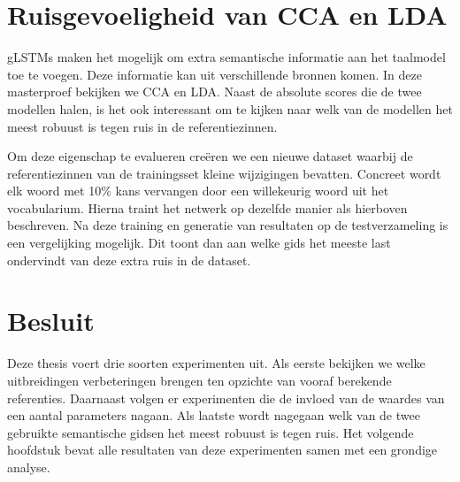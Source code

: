 \section{Ruisgevoeligheid van CCA en LDA} %
\label{sec:ruisgevoeligheid_van_cca_en_lda_exp}
gLSTMs maken het mogelijk om extra semantische informatie aan het taalmodel toe te voegen. Deze informatie kan uit verschillende bronnen komen. In deze masterproef bekijken we CCA en LDA. Naast de absolute scores die de twee modellen halen, is het ook interessant om te kijken naar welk van de modellen het meest robuust is tegen ruis in de referentiezinnen.

Om deze eigenschap te evalueren cre\"eren we een nieuwe dataset waarbij de referentiezinnen van de trainingsset kleine wijzigingen bevatten.
Concreet wordt elk woord met 10\% kans vervangen door een willekeurig woord uit het vocabularium. Hierna traint het netwerk op dezelfde manier als hierboven beschreven. Na deze training en generatie van resultaten op de testverzameling is een vergelijking mogelijk. Dit toont dan aan welke gids het meeste last ondervindt van deze extra ruis in de dataset.

\section{Besluit}
Deze thesis voert drie soorten experimenten uit. Als eerste bekijken we welke uitbreidingen verbeteringen brengen ten opzichte van vooraf berekende referenties. Daarnaast volgen er experimenten die de invloed van de waardes van een aantal parameters nagaan. Als laatste wordt nagegaan welk van de twee gebruikte semantische gidsen het meest robuust is tegen ruis.
Het volgende hoofdstuk bevat alle resultaten van deze experimenten samen met een grondige analyse.

